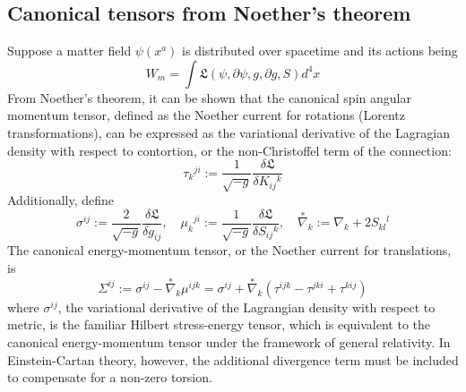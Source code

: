 \documentclass[11pt]{article}
\begin{document}
\subsection{Canonical tensors from Noether's theorem \cite{hehl1976general}}
Suppose a matter field $\psi(x^a)$ is distributed over spacetime and its actions being
\[ W_m = \int \mathfrak{L}(\psi,\partial\psi, g,\partial g, S) d^4x \]
From Noether's theorem, it can be shown that the canonical spin angular momentum tensor, defined as the Noether current for rotations (Lorentz transformations), can be expressed as the variational derivative of the Lagragian density with respect to contortion, or the non-Christoffel term of the connection:
\[\tau_k{}^{ji} := \frac{1}{\sqrt{-g}}\frac{\delta\mathfrak{L}}{\delta K_{ij}{}^k}\]
Additionally, define
\[ \sigma^{ij} := \frac{2}{\sqrt{-g}}\frac{\delta\mathfrak{L}}{\delta g_{ij}},
\quad \mu_{k}{}^{ji} := \frac{1}{\sqrt{-g}}\frac{\delta\mathfrak{L}}{\delta S_{ij}{}^k},
\quad \stackrel{*}{\nabla}_k := \nabla_k + 2S_{kl}{}^l\]
The canonical energy-momentum tensor, or the Noether current for translations, is
 \[ \Sigma^{ij} := \sigma^{ij} - \stackrel{*}{\nabla}_k\mu^{ijk}  = \sigma^{ij} + \stackrel{*}{\nabla}_k(\tau^{ijk} - \tau^{jki} + \tau^{kij})\]
where $\sigma^{ij}$, the variational derivative of the Lagrangian density with respect to metric, is the familiar Hilbert stress-energy tensor, which is equivalent to the canonical energy-momentum tensor under the framework of general relativity. In Einstein-Cartan theory, however, the additional divergence term must be included to compensate for a non-zero torsion.
\end{document}
